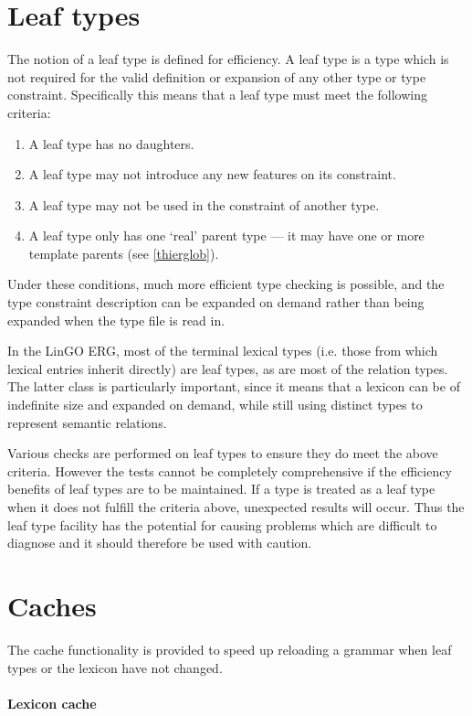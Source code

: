 \documentclass[12pt]{report}
\begin{document}
\section{Leaf types}
\label{leaftypes}

The notion of a leaf type is defined for efficiency.  A leaf type
is a type which is not required for the valid definition or expansion of
any other type or type constraint.  
Specifically this means that a leaf type
must meet the following criteria:
\begin{enumerate}
\item A leaf type has no daughters.
\item A leaf type may not introduce any new features on its constraint.
\item A leaf type may not be used in the constraint of another type.
\item A leaf type only has one `real' parent type --- it may have one or more
template parents (see \ref{thierglob}).
\end{enumerate}
Under these conditions, much more efficient type checking is possible,
and the type constraint description
can be expanded on demand rather than being expanded 
when the type file is read in.

In the LinGO ERG, most of the terminal lexical types (i.e. those from 
which lexical entries inherit directly) are leaf types, as are most of
the relation types.  The latter class is particularly important,
since it means that a lexicon can be of indefinite size and expanded on
demand, while still using distinct types to represent semantic relations.

Various checks are performed on leaf types to ensure they do meet
the above criteria.  However the tests cannot be completely comprehensive
if the efficiency benefits of leaf types are to be maintained.
If a type is treated as a leaf type when it does not fulfill the
criteria above, unexpected results will occur.  Thus
the leaf type facility has the potential for causing 
problems which are difficult to diagnose and it should therefore be
used with caution.


\section{Caches}
\label{cache}

The cache functionality is provided to speed
up reloading a grammar when leaf types or 
the lexicon have not changed.  

\paragraph{Lexicon cache}
\end{document}
